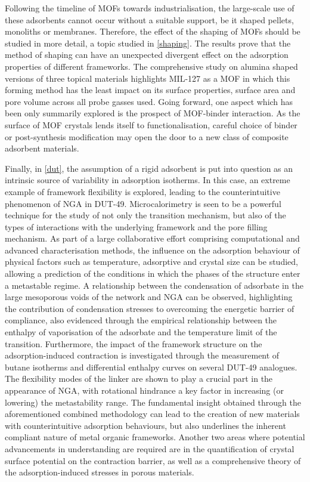 Following the timeline of \glspl{MOF} towards industrialisation, the 
large-scale use of these adsorbents cannot occur without a suitable
support, be it shaped pellets, monoliths or membranes. Therefore,
the effect of the shaping of \glspl{MOF} should be studied in more detail,
a topic studied in \autoref{shaping}. The results prove that the method
of shaping can have an unexpected divergent effect on the adsorption 
properties of different frameworks. The comprehensive study on 
alumina shaped versions of three topical materials highlights
MIL-127 as a \gls{MOF} in which this forming method has the least impact on
its surface properties, surface area and pore volume across all 
probe gasses used. Going forward, one aspect which has been only 
summarily explored is the prospect of \gls{MOF}-binder interaction. 
As the surface of \gls{MOF} crystals lends itself to functionalisation, 
careful choice of binder or post-synthesis modification may open the
door to a new class of composite adsorbent materials.

Finally, in \autoref{dut}, the assumption of a rigid adsorbent 
is put into question as an intrinsic source of variability in adsorption
isotherms. In this case, an extreme example of framework flexibility
is explored, leading to the counterintuitive phenomenon of \gls{NGA}
in DUT-49.
Microcalorimetry is seen to be a powerful technique for the study
of not only the transition mechanism, but also of the types of
interactions with the underlying framework and the pore filling
mechanism. As part of a large collaborative effort comprising
computational and advanced characterisation methods, the
influence on the adsorption behaviour of physical factors such
as temperature, adsorptive and crystal size can be studied, allowing
a prediction of the conditions in which the phases of the structure
enter a metastable regime. A relationship between the condensation 
of adsorbate in the large mesoporous voids of the network and \gls{NGA}
can be observed, highlighting the contribution of condensation 
stresses to overcoming the energetic barrier of compliance, also 
evidenced through the empirical relationship between the enthalpy
of vaporisation of the adsorbate and the temperature limit 
of the transition. Furthermore, the impact of the framework
structure on the adsorption-induced contraction is investigated
through the measurement of butane isotherms and differential enthalpy
curves on several DUT-49 analogues. The flexibility modes of the 
linker are shown to play a crucial part in the appearance of 
\gls{NGA}, with rotational hindrance a key factor in increasing
(or lowering) the metastability range. The fundamental insight obtained 
through the aforementioned combined methodology
can lead to the creation of new materials with counterintuitive
adsorption behaviours, but also underlines the inherent compliant
nature of metal organic frameworks. Another two areas where potential
advancements in understanding are required are in the quantification 
of crystal surface potential on the contraction barrier, as well as 
a comprehensive theory of the adsorption-induced stresses in porous
materials. 

